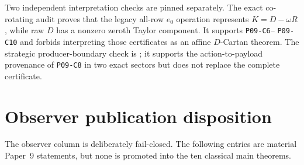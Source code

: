 \documentclass[11pt]{article}
\begin{document}
Two independent interpretation checks are pinned separately.  The exact
co-rotating audit
 proves that the legacy
all-row $e_0$ operation represents $K=D-\omega R$, while raw $D$ has a
nonzero zeroth Taylor component.  It supports \texttt{P09-C6}--
\texttt{P09-C10} and forbids interpreting those certificates as an affine
$D$-Cartan theorem.  The strategic producer-boundary check is
; it supports the
action-to-payload provenance of \texttt{P09-C8} in two exact sectors but does
not replace the complete  certificate.

\section{Observer publication disposition}

The observer column is deliberately fail-closed.  The following entries are
material Paper~9 statements, but none is promoted into the ten classical main
theorems.
\end{document}
